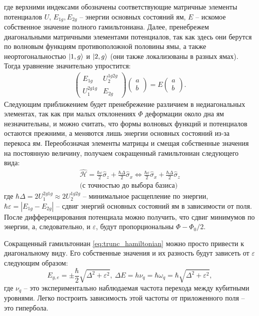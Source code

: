 \documentclass[12pt, twoside]{report}
\DeclarePairedDelimiter\ket{\lvert}{\rangle}
\numberwithin{equation}{section}
\numberwithin{figure}{section}
\begin{document}
где верхними индексами обозначены соответствующие матричные элементы потенциалов $U$, $E_{1g}, E_{2g}$ -- энергии основных состояний ям, $E$ -- искомое собственное значение полного гамильтониана. Далее, пренебрежем диагональными матричными элементами потенциалов, так как здесь они берутся по волновым функциям противоположной половины ямы, а также неортогональностью $\ket{1, g}$ и $\ket{2, g}$ (они также локализованы в разных ямах). Тогда уравнение значительно упростится:
\begin{align*}
\left(\begin{matrix}
E_{1g} &  U_2^{1g2g}\\ 
U_1^{2g1g} & E_{2g}
\end{matrix}\right) 
\left(\begin{matrix}
a \\b 
\end{matrix}\right) = 
E
\left(\begin{matrix}
a \\b 
\end{matrix}\right).
\end{align*}
Следующим приближением будет пренебрежение различием в недиагональных элементах, так как при малых отклонениях $\Phi$ деформации около дна ям незначительны, и можно считать, что формы волновых функций и потенциалов остаются прежними, а меняются лишь энергии основных состояний из-за перекоса ям. Переобозначая элементы матрицы и смещая собственные значения на постоянную величину, получаем сокращенный гамильтониан следующего вида:
\begin{equation}
\begin{gathered}
\mathcal{\hat H} = \frac{\hbar \varepsilon}{2} \hat\sigma_z + \frac{\hbar \Delta}{2} \hat \sigma_x \Leftrightarrow \frac{\hbar \varepsilon}{2} \hat\sigma_x + \frac{\hbar\Delta}{2} \hat \sigma_z \\ 
\text{(с точностью до выбора базиса)} 
\end{gathered}
\label{eq:trunc_hamiltonian} 
\end{equation}
где $\hbar \Delta = 2 U_1^{2g1g} \approx 2U_2^{1g2g}$ -- минимальное расщепление по энергии, $\hbar \varepsilon = |E_{1g} - E_{2g}|$ -- сдвиг энергий основных состояний ям в зависимости от поля. После дифференцирования потенциала можно получить, что сдвиг минимумов по энергии, а, следовательно, и $\varepsilon$, будут пропорциональны $\Phi - \Phi_0/2$.

Сокращенный гамильтониан \eqref{eq:trunc_hamiltonian} можно просто привести к диагональному виду. Его собственные значения и их разность будут зависеть от $\varepsilon$ следующим образом:
\begin{equation}
E_{g, e} = \pm \frac{\hbar}{2}\sqrt{\Delta^2 + \varepsilon^2},\
\Delta E = h \nu_q = \hbar \omega_q = \hbar\sqrt{\Delta^2 + \varepsilon^2},
\end{equation}
где $\nu_q$ -- это экспериментально наблюдаемая частота перехода между кубитными уровнями. Легко построить зависимость этой частоты от приложенного поля -- это гипербола.
\end{document}
